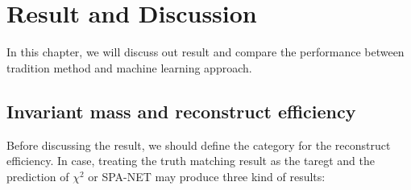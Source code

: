 \chapter{Result and Discussion} \label{Discussion}

In this chapter, we will discuss out result and compare the performance between tradition method and machine learning approach.

\section{Invariant mass and reconstruct efficiency }\label{sec:inv mass and reco eff}

Before discussing the result, we should define the category for the reconstruct efficiency. In case, treating the truth matching result as the taregt and the prediction of $\chi^{2}$ or SPA-NET may produce three kind of results:


